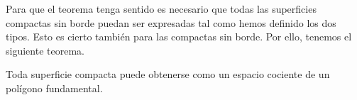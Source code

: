 \documentclass[GTS.tex]{subfiles}
\begin{document}
\begin{observacion}
\end{observacion}

Para que el teorema tenga sentido es necesario que todas las superficies compactas sin borde puedan ser expresadas tal como hemos definido los dos tipos. Esto es cierto también para las compactas sin borde. Por ello, tenemos el siguiente teorema.

\begin{teorema} Toda superficie compacta puede obtenerse  como un espacio cociente de un polígono fundamental.
\end{teorema}

\newpage
\end{document}
